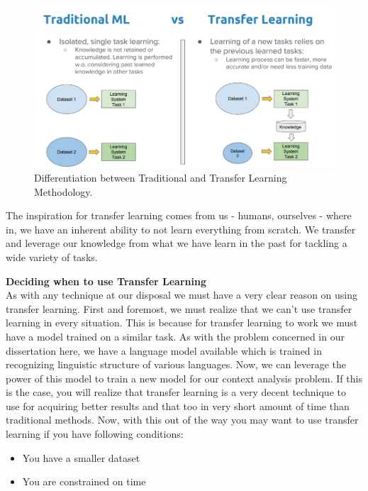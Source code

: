 \documentclass[a4paper, 12pt]{article}
\begin{document}
\begin{sloppypar}
\begin{figure}[H]
\begin{center}
\includegraphics[scale=0.45]{tl.png}
\caption{Differentiation between Traditional and Transfer Learning Methodology.\cite{noauthor_guide_2019} \label{tl}}
\end{center}
\end{figure}

The inspiration for transfer learning comes from us - humans, ourselves - where in, we have an inherent ability to not learn everything from scratch. We transfer and leverage our knowledge from what we have learn in the past for tackling a wide variety of tasks.\cite{sarkar_deep_2018}

\large \textbf{Deciding when to use Transfer Learning} \\ [0.5ex]
\normalsize
As with any technique at our disposal we must have a very clear reason on using transfer learning. First and foremost, we must realize that we can't use transfer learning in every situation. This is because for transfer learning to work we must have a model trained on a similar task. As with the problem concerned in our dissertation here, we have  a language model available which is trained in recognizing linguistic structure of  various languages. Now, we can leverage the power of this model to train a new model for our
\thispagestyle{empty}
\clearpage
 context analysis problem. If this is the case, you will realize that transfer learning is a very decent technique to use for acquiring better results and that too in very short amount of time than traditional methods. Now, with this out of the way you may want to use transfer learning if you have following conditions:
\begin{itemize}
\item{You have a smaller dataset}
\item{You are constrained on time}
\end{itemize}


\end{sloppypar}
\end{document}
